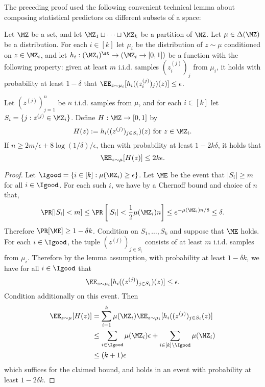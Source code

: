 \noindent The preceding proof used the following convenient technical lemma about composing statistical predictors on different subsets of a space:

\begin{lemma}\label{lemma:compose-predictors}
Let $\MZ$ be a set, and let $\MZ_1 \sqcup \dots \sqcup \MZ_k$ be a partition of $\MZ$. Let $\mu \in \Delta(\MZ)$ be a distribution. For each $i \in [k]$ let $\mu_i$ be the distribution of $z \sim \mu$ conditioned on $z \in \MZ_i$, and let $h_i: (\MZ_i)^\st \to (\MZ_i\to[0,1])$ be a function with the following property: given at least $m$ i.i.d. samples $(z^{(j)}_i)_j$ from $\mu_i$, it holds with probability at least $1-\delta$ that $\EE_{z\sim\mu_i}[h_i((z_i^{(j)})_j)(z)] \leq \epsilon$.

Let $(z^{(j)})_{j=1}^n$ be $n$ i.i.d. samples from $\mu$, and for each $i \in [k]$ let $S_i = \{j: z^{(j)} \in \MZ_i\}$. Define $H: \MZ \to [0,1]$ by
\[H(z) := h_i((z^{(j)})_{j \in S_i})(z) \text{ for } z \in \MZ_i.\]
If $n \geq 2m/\epsilon + 8\log(1/\delta)/\epsilon$, then with probability at least $1-2k\delta$, it holds that
\[\EE_{z \sim \mu}[H(z)] \leq 2k\epsilon.\]
\end{lemma}

\begin{proof}
Let $\Igood = \{i \in [k]: \mu(\MZ_i) \geq \epsilon\}$. Let $\ME$ be the event that $|S_i| \geq m$ for all $i \in \Igood$. For each such $i$, we have by a Chernoff bound and choice of $n$ that,
\[\Pr[|S_i| < m] \leq \Pr\left[|S_i| < \frac{1}{2} \mu(\MZ_i) n\right] \leq e^{-\mu(\MZ_i) n/8} \leq \delta.\]
Therefore $\Pr[\ME] \geq 1-\delta k$. Condition on $S_1,\dots,S_k$ and suppose that $\ME$ holds. For each $i \in \Igood$, the tuple $(z^{(j)})_{j \in S_i}$ consists of at least $m$ i.i.d. samples from $\mu_i$. Therefore by the lemma assumption, with probability at least $1-\delta k$, we have for all $i \in \Igood$ that
\[\EE_{z \sim \mu_i}[h_i((z^{(j)})_{j \in S_i})(z)] \leq \epsilon.\]
Condition additionally on this event. Then
\begin{align*}
\EE_{z \sim \mu}[H(z)]
&= \sum_{i = 1}^k \mu(\MZ_i) \EE_{z \sim \mu_i}[h_i((z^{(j)})_{j \in S_i}(z)] \\ 
&\leq \sum_{i\in\Igood} \mu(\MZ_i) \epsilon + \sum_{i \in [k]\setminus\Igood} \mu(\MZ_i) \\ 
&\leq (k+1)\epsilon
\end{align*}
which suffices for the claimed bound, and holds in an event with probability at least $1-2\delta k$.
\end{proof}

